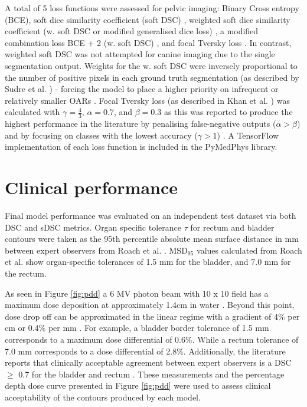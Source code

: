 A total of 5 loss functions were assessed for pelvic imaging: Binary Cross entropy (BCE), soft dice similarity coefficient (soft DSC) \cite{Bertels2019}, weighted soft dice similarity coefficient (w. soft DSC or modified generalised dice loss) \cite{Sudre_2017}, a modified combination loss BCE + 2 (w. soft DSC) \cite{taghanaki2018}, and focal Tversky loss \cite{Zhu_2018, Khan2019, abraham2018}. In contrast, weighted soft DSC was not attempted for canine imaging due to the single segmentation output. Weights for the w. soft DSC were inversely proportional to the number of positive pixels in each ground truth segmentation (as described by Sudre et al. \cite{Sudre_2017}) - forcing the model to place a higher priority on infrequent or relatively smaller OARs \cite{Sudre_2017}. Focal Tversky  loss (as described in Khan et al. \cite{Khan2019}) was calculated with $\gamma = \frac{4}{3}$, $\alpha=0.7$, and $\beta=0.3$ as this was reported to produce the highest performance in the literature \cite{Khan2019} by penalising false-negative outputs ($\alpha > \beta$) and by focusing on classes with the lowest accuracy ($\gamma > 1$) \cite{Khan2019}. A TensorFlow implementation of each loss function is included in the PyMedPhys library.

\section{Clinical performance}

Final model performance was evaluated on an independent test dataset via both DSC and sDSC metrics. Organ specific tolerance $\tau$ for rectum and bladder contours were taken as the 95th percentile absolute mean surface distance in mm between expert observers from Roach et al. \cite{Roach_2019}. MSD$_{95}$ values calculated from Roach et al. show organ-specific tolerances of 1.5 mm for the bladder, and 7.0 mm for the rectum. 

As seen in Figure \ref{fig:pdd} a 6 MV photon beam with 10 x 10 field has a maximum dose deposition at approximately 1.4cm in water \cite{Nurdin}. Beyond this point, dose drop off can be approximated in the linear regime with a gradient of 4\% per cm or 0.4\% per mm \cite{Nurdin}. For example, a bladder border tolerance of 1.5 mm corresponds to a maximum dose differential of 0.6\%. While a rectum tolerance of 7.0 mm corresponds to a dose differential of 2.8\%. Additionally, the literature reports that clinically acceptable agreement between expert observers is a DSC $\geq$ 0.7 for the bladder and rectum \cite{Roach_2019}. These measurements and the percentage depth dose curve presented in Figure \ref{fig:pdd} were used to assess clinical acceptability of the contours produced by each model.


